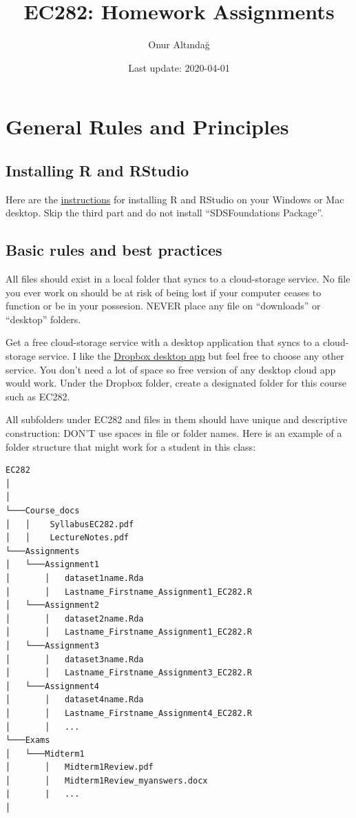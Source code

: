 \documentclass[
]{book}
\title{EC282: Homework Assignments}
\author{Onur Altındağ}
\date{Last update: 2020-04-01}
\begin{document}
\maketitle

{
\setcounter{tocdepth}{1}
\tableofcontents
}
\hypertarget{general-rules-and-principles}{%
\chapter{General Rules and Principles}\label{general-rules-and-principles}}

\hypertarget{installing-r-and-rstudio}{%
\section{Installing R and RStudio}\label{installing-r-and-rstudio}}

Here are the \href{https://courses.edx.org/courses/UTAustinX/UT.7.01x/3T2014/56c5437b88fa43cf828bff5371c6a924/}{instructions} for installing R and RStudio on your Windows or Mac desktop. Skip the third part and do not install ``SDSFoundations Package''.

\hypertarget{basic-rules-and-best-practices}{%
\section{Basic rules and best practices}\label{basic-rules-and-best-practices}}

All files should exist in a local folder that syncs to a cloud-storage service. No file you ever work on should be at risk of being lost if your computer ceases to function or be in your possesion. NEVER place any file on ``downloads'' or ``desktop'' folders.

Get a free cloud-storage service with a desktop application that syncs to a cloud-storage service. I like the \href{https://help.dropbox.com/installs-integrations/desktop/desktop-application-overview}{Dropbox desktop app} but feel free to choose any other service. You don't need a lot of space so free version of any desktop cloud app would work. Under the Dropbox folder, create a designated folder for this course such as EC282.

All subfolders under EC282 and files in them should have unique and descriptive construction: DON'T use spaces in file or folder names. Here is an example of a folder structure that might work for a student in this class:

\begin{verbatim}
EC282
│  
│
└───Course_docs
│   │    SyllabusEC282.pdf
│   │    LectureNotes.pdf 
└───Assignments
│   └───Assignment1
│       │   dataset1name.Rda
│       │   Lastname_Firstname_Assignment1_EC282.R
│   └───Assignment2
│       │   dataset2name.Rda
│       │   Lastname_Firstname_Assignment1_EC282.R
│   └───Assignment3
│       │   dataset3name.Rda
│       │   Lastname_Firstname_Assignment3_EC282.R
│   └───Assignment4
│       │   dataset4name.Rda
│       │   Lastname_Firstname_Assignment4_EC282.R
│       │   ...
└───Exams
│   └───Midterm1
│       │   Midterm1Review.pdf
│       │   Midterm1Review_myanswers.docx
|       |   ...
│   
\end{verbatim}
\end{document}
